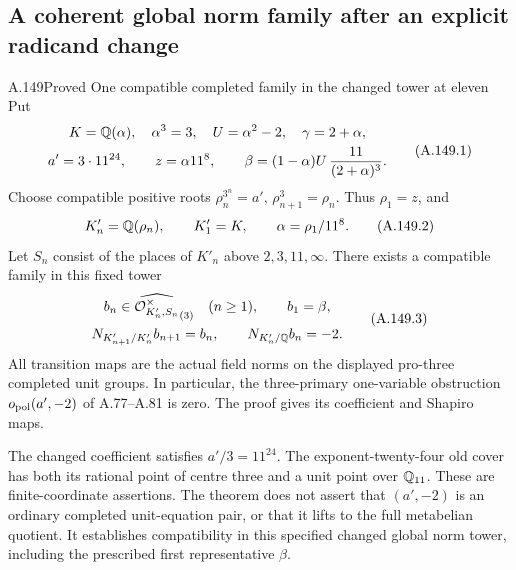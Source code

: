 \subsection{A coherent global norm family after an explicit radicand change}

\begin{statement}{A.149}{Proved}
{One compatible completed family in the changed tower at eleven}
Put
\[
 \begin{gathered}
 K=\mathbb Q(\alpha),\quad \alpha^3=3,\quad U=\alpha^2-2,
 \quad \gamma=2+\alpha,\\
 a'=3\cdot11^{24},\qquad z=\alpha11^8,\qquad
 \beta=(1-\alpha)U\,\frac{11}{(2+\alpha)^3}.
 \end{gathered}
\tag{A.149.1}
\]
Choose compatible positive roots
\(\rho_n^{3^n}=a'\), \(\rho_{n+1}^3=\rho_n\).
Thus \(\rho_1=z\), and
\[
 K'_n=\mathbb Q(\rho_n),\qquad K'_1=K,
 \qquad \alpha=\rho_1/11^8.
\tag{A.149.2}
\]
Let \(S_n\) consist of the places of \(K'_n\) above
\(2,3,11,\infty\).
There exists a compatible family in this fixed tower
\[
 \begin{gathered}
 b_n\in\widehat{\mathcal O_{K'_n,S_n}^{\times}}_{(3)}
                  \quad(n\geq1),\qquad b_1=\beta,\\
 N_{K'_{n+1}/K'_n}b_{n+1}=b_n,
                    \qquad N_{K'_n/\mathbb Q}b_n=-2.
 \end{gathered}
\tag{A.149.3}
\]
All transition maps are the actual field norms on the
displayed pro-three completed unit groups.
In particular, the three-primary one-variable obstruction
\(o_{\rm pol}(a',-2)\) of A.77--A.81 is zero.
The proof gives its coefficient and Shapiro maps.

The changed coefficient satisfies \(a'/3=11^{24}\).
The exponent-twenty-four old cover has both its rational
point of centre three and a unit point over \(\mathbb Q_{11}\).
These are finite-coordinate assertions.  The theorem
does not assert that \((a',-2)\) is an ordinary completed
unit-equation pair, or that it lifts to the full metabelian
quotient.  It establishes compatibility in this specified
changed global norm tower, including the prescribed
first representative \(\beta\).
\end{statement}
